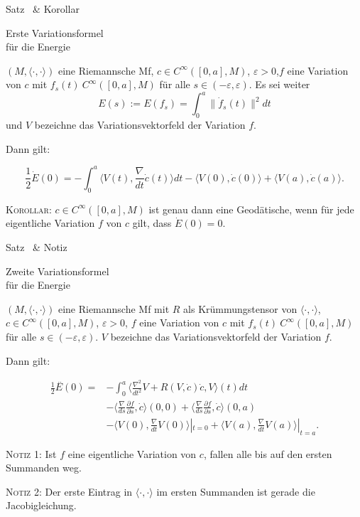 \documentclass[a6paper,11pt,grid=front]{kartei}
\newcommand{\fl}[1]{\begin{flushleft}
 #1 \end{flushleft}}
\newcommand{\eps}{\varepsilon}
\newcommand{\blf}[1]{\langle #1 \rangle}
\newcommand{\nabladt}[1][t]{\frac{\nabla}{d#1}}
\newcounter{def}
\newcounter{satz}
\newcommand{\defreset}{\setcounter{def}{1}}
\newcommand{\satzreset}{\setcounter{satz}{1}}
\newcommand{\thissatz}{\thesatz\ \stepcounter{satz}}
\begin{document}
\nonameyet
{\scriptsize Satz \thissatz \& Korollar} 
{ \begin{minipage}{0.28\linewidth}
\scriptsize Erste Variationsformel\\ für die Energie
\end{minipage}}
{
	\small
$(M,\blf{\cdot,\cdot})$ eine Riemannsche Mf, $c\in C^\infty([0,a],M)$, 
$\eps > 0$,$f$ eine 
Variation von $c$ mit $f_s(t)\ C^\infty([0,a],M)$ für alle $s\in (-\eps,\eps)$. 
Es sei weiter  
\[
E(s) := E(f_s) = \int_0^a \| \dot f_s(t)\|^2 dt
\]
und $V$ bezeichne das Variationsvektorfeld der Variation $f$.
\fl{Dann gilt:}
\[
\frac{1}{2} \dot E(0) = - \int_0^a \blf{V(t),\nabladt \dot c (t)}dt 
- \blf{V(0),\dot c(0)} + \blf{V(a), \dot c(a)}.
\]

\fl{\textsc{Korollar:} $c\in C^\infty([0,a],M)$ ist genau dann eine Geodätische,
wenn für jede eigentliche Variation $f$ von $c$ gilt, dass $\dot E(0) = 0$.}
}
{}
\newcommand{\ddt}[1]{\overset{\;\textbf{..}}{#1}}
\newcommand{\nabladdt}{\frac{\nabla^2}{dt^2}}
\nonameyet
{\scriptsize Satz \thissatz \& Notiz} 
{ \begin{minipage}{0.28\linewidth}
\scriptsize Zweite Variationsformel\\ für die Energie
\end{minipage}}
{
	\small
$(M,\blf{\cdot,\cdot})$ eine Riemannsche Mf mit $R$ als Krümmungstensor von 
$\blf{\cdot,\cdot}$, $c\in C^\infty([0,a],M)$, $\eps > 0$, $f$ eine 
Variation von $c$ mit $f_s(t)\ C^\infty([0,a],M)$ für alle $s\in (-\eps,\eps)$. 
$V$ bezeichne das Variationsvektorfeld der Variation $f$.
\fl{Dann gilt:}
\[
\begin{aligned}
\frac{1}{2} \ddt{E}(0) =& 
- \int_0^a \blf{\nabladdt V + R(V,\dot c)\dot c, V}(t) dt 
\\ &
- \blf{\nabladt[s] \frac{\partial f}{\partial s}, \dot c}(0,0)
+ \blf{\nabladt[s] \frac{\partial f}{\partial s}, \dot c}(0,a)
\\ &
- \blf{V(0),\nabladt V(0)}|_{t=0} + \blf{V(a), \nabladt V(a)}|_{t =a}.
\end{aligned}
\]

\fl{\textsc{Notiz 1:} Ist $f$ eine eigentliche Variation von $c$, fallen alle 
bis auf den ersten Summanden weg.}

\fl{\textsc{Notiz 2:} Der erste Eintrag in $\blf{\cdot,\cdot}$ im ersten 
Summanden ist gerade die Jacobigleichung.}
}
{}

\defreset
\satzreset
{}
\end{document}
